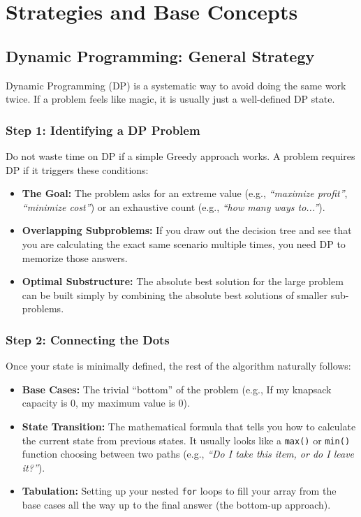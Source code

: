 \section{Strategies and Base Concepts}


\subsection{Dynamic Programming: General Strategy}
Dynamic Programming (DP) is a systematic way to avoid doing the same work twice.
If a problem feels like magic, it is usually just a well-defined DP state.

\subsubsection{Step 1: Identifying a DP Problem}
Do not waste time on DP if a simple Greedy approach works.
A problem requires DP if it triggers these conditions:
\begin{itemize}
    \item \textbf{The Goal:} The problem asks for an extreme value (e.g., \textit{``maximize profit''}, \textit{``minimize cost''}) or an exhaustive count (e.g., \textit{``how many ways to...''}).
    \item \textbf{Overlapping Subproblems:} If you draw out the decision tree and see that you are calculating the exact same scenario multiple times, you need DP to memorize those answers.
    \item \textbf{Optimal Substructure:} The absolute best solution for the large problem can be built simply by combining the absolute best solutions of smaller sub-problems.
\end{itemize}

\subsubsection{Step 2: Connecting the Dots}
Once your state is minimally defined, the rest of the algorithm naturally follows:
\begin{itemize}
    \item \textbf{Base Cases:} The trivial ``bottom'' of the problem (e.g., If my knapsack capacity is 0, my maximum value is 0).
    \item \textbf{State Transition:} The mathematical formula that tells you how to calculate the current state from previous states.
    It usually looks like a \texttt{max()} or \texttt{min()} function choosing between two paths (e.g., \textit{``Do I take this item, or do I leave it?''}).
    \item \textbf{Tabulation:} Setting up your nested \texttt{for} loops to fill your array from the base cases all the way up to the final answer (the bottom-up approach).
\end{itemize}

